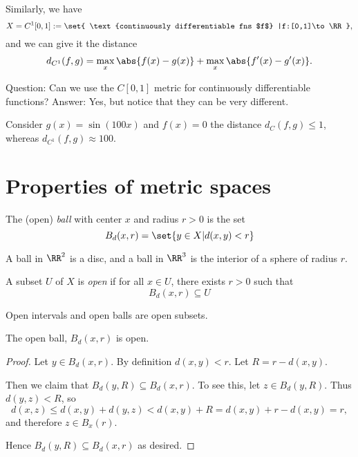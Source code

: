 \documentclass{article}
\begin{document}
Similarly, we have 
\[ X=C^1[0,1]:=
\set{
    \text{continuously differentiable fns $f$}
    |f:[0,1]\to\RR},
    \]
and we can give it the distance
\[ d_{C^1}(f,g) = \max_x\abs{f(x)-g(x)}+\max_x\abs{f'(x)-g'(x)}.
\]

Question: Can we use the $C[0,1]$ metric for continuously differentiable functions?
Answer: Yes, but notice that they can be very different.

Consider $g(x)=\sin(100x)$ and $f(x)=0$ the distance 
$d_C(f,g)\le 1$, whereas $d_{C^1}(f,g) \approx 100$.

\section{Properties of metric spaces}

\begin{definition}
    The (open) \emph{ball} with center $x$ and radius $r>0$ is the set
    \[ B_d(x,r) = \set{y\in X |d(x,y) < r } \]
\end{definition}

\begin{example}
    A ball in $\RR^2$ is a disc,
     and a ball in $\RR^3$ is the interior of a sphere of radius $r$.
\end{example}

\begin{definition}
    A subset $U$ of $X$ is \emph{open} if for all $x\in U$,
    there exists $r > 0$ such that
    \[ B_d(x,r)\subseteq U \]
\end{definition}

\begin{example}
    Open intervals and open balls are open subsets.
\end{example}

\begin{proposition}
    The open ball, $B_d(x,r)$ is open.
\end{proposition}

\begin{proof}
    Let $y\in B_d(x,r)$. By definition $d(x,y)<r$. Let $R=r-d(x,y)$.

    Then we claim that $B_d(y,R)\subseteq B_d(x,r)$. To see this,
    let $z\in B_d(y,R)$. Thus $d(y,z)<R$,
    so 
    \[d(x,z) \le d(x,y) + d(y,z) < d(x,y) + R = d(x,y)+r-d(x,y)=r,\]
    and therefore $z\in B_x(r)$.

    Hence $B_d(y,R)\subseteq B_d(x,r)$ as desired.
\end{proof}
\end{document}
